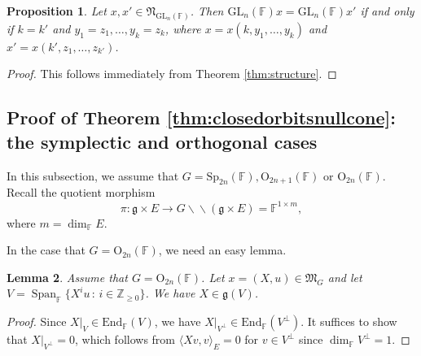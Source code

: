 \documentclass[12pt]{amsart}
\newtheorem{lm}{Lemma}[section]
\newtheorem{prop}[lm]{Proposition}
\theoremstyle{definition}
\theoremstyle{remark}\newtheorem{rmk}[lm]{Remark}
\newcommand{\RO}{{\mathrm {O}}}
\newcommand{\End}{{\mathrm{End}}}
\newcommand{\GL}{{\mathrm{GL}}}
\newcommand{\Sp}{{\mathrm{Sp}}}
\newcommand{\Span}{\operatorname{Span}}
\newcommand{\g}{\mathfrak g}
\newcommand{\fM}{\mathfrak M}
\newcommand{\fN}{\mathfrak N}
\newcommand{\Z}{\mathbb{Z}}
\newcommand{\C}{\mathbb{F}}
\newcommand{\bac}{\backslash\!\!\backslash}
\renewcommand{\mid}{\,:\,}
\begin{document}
    
    \begin{prop}
        \label{prop:closedorbitglndifferent}
        Let $x,x'\in\fN_{\GL_n(\C)}$. Then $\GL_n(\C)x=\GL_n(\C)x'$ if and only if $k=k'$ and $y_1=z_1,\dots,y_k=z_k$, where $x=x(k,y_1,\dots,y_k)$ and $x'=x(k',z_1,\dots,z_{k'})$.
    \end{prop}
    \begin{proof}
        This follows immediately from Theorem \ref{thm:structure}.
    \end{proof}
    
	\subsection{Proof of Theorem \ref{thm:closedorbitsnullcone}: the symplectic and orthogonal cases}
	In this subsection, we assume that $G=\Sp_{2n}(\C),\RO_{2n+1}(\C)$ or $\RO_{2n}(\C)$. Recall the quotient morphism
	\begin{equation*}
		\pi:\g\times E\to G\bac (\g\times E)=\C^{1\times m},
	\end{equation*}
	where $m=\dim_{\C}E$.
	
	In the case that $G=\RO_{2n}(\C)$, we need an easy lemma.
	
	\begin{lm}
		\label{lm:evenorthogonalrestriction}
		Assume that $G=\RO_{2n}(\C)$. Let $x=(X,u)\in\fM_G$ and let $V=\Span_{\C}\{X^iu\mid i\in\Z_{\geq 0}\}$. We have $X\in\g(V)$.
	\end{lm}
	\begin{proof}
		Since $X|_V\in\End_{\C}(V)$, we have $X|_{V^{\bot}}\in\End_{\C}(V^{\bot})$. It suffices to show that $X|_{V^{\bot}}=0$, which follows from $\langle Xv,v\rangle_E=0$ for $v\in V^{\bot}$ since $\dim_{\C}V^{\bot}=1$.
	\end{proof}
	
\end{document}
